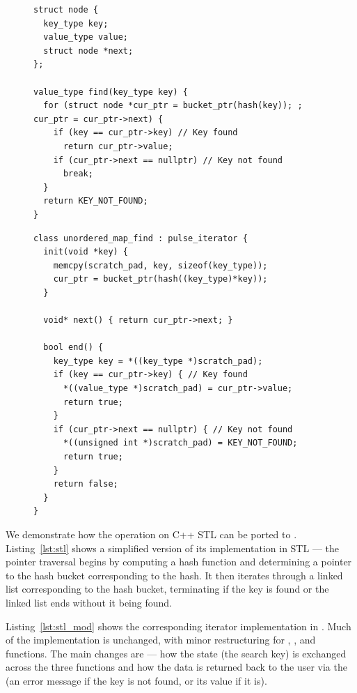 \begin{figure}[t]
\centering
\begin{lstlisting}[caption={C++ STL realization for \code{unordered\_map::find()}.},label={lst:stl}]
struct node {
  key_type key;
  value_type value;
  struct node *next;
};

value_type find(key_type key) {
  for (struct node *cur_ptr = bucket_ptr(hash(key)); ; cur_ptr = cur_ptr->next) {
    if (key == cur_ptr->key) // Key found
      return cur_ptr->value;
    if (cur_ptr->next == nullptr) // Key not found
      break;
  }
  return KEY_NOT_FOUND;
}
\end{lstlisting}
\begin{lstlisting}[caption={\name realization for \code{unordered\_map::find()}.},label={lst:stl_mod}]
class unordered_map_find : pulse_iterator {
  init(void *key) {
    memcpy(scratch_pad, key, sizeof(key_type));
    cur_ptr = bucket_ptr(hash((key_type)*key));
  }
  
  void* next() { return cur_ptr->next; }
  
  bool end() {
    key_type key = *((key_type *)scratch_pad);
    if (key == cur_ptr->key) { // Key found
      *((value_type *)scratch_pad) = cur_ptr->value;
      return true;
    }
    if (cur_ptr->next == nullptr) { // Key not found
      *((unsigned int *)scratch_pad) = KEY_NOT_FOUND;  
      return true;
    }
    return false;
  }
}
\end{lstlisting}
\end{figure}

 We demonstrate how the  operation on C++ STL  can be ported to \name. Listing~\ref{lst:stl} shows a simplified version of its implementation in STL --- the pointer traversal begins by computing a hash function and determining a pointer to the hash bucket corresponding to the hash. It then iterates through a linked list corresponding to the hash bucket, terminating if the key is found or the linked list ends without it being found.

Listing~\ref{lst:stl_mod} shows the corresponding iterator implementation in \name. Much of the implementation is unchanged, with minor restructuring for , , and  functions. The main changes are --- how the state (the search key) is exchanged across the three functions and how the data is returned back to the user via the  (an error message if the key is not found, or its value if it is).   


